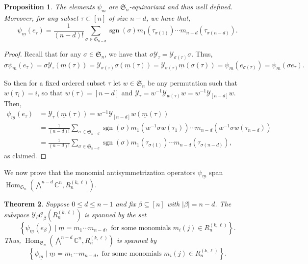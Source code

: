 \documentclass[11pt, reqno]{amsart}
\newtheorem{theorem}{Theorem}[section]
\newtheorem{proposition}[theorem]{Proposition}
\theoremstyle{definition}
\theoremstyle{remark}
\numberwithin{equation}{section}
\newcommand{\0}{\emptyset}
\newcommand{\C}{\mathbb{C}}
\renewcommand{\S}{\mathfrak{S}}
\newcommand{\cC}{\mathcal{C}}
\newcommand{\cY}{\mathcal{Y}}
\newcommand{\m}{\underline{m}}
\DeclareMathOperator{\sgn}{sgn}
\DeclareMathOperator{\Hom}{Hom}
\begin{document}
\begin{proposition}\label{prop:psi-m-well-defined}
    The elements $\psi_{\m}$ are $\S_n$-equivariant and thus well defined.
 Moreover, for any subset $\tau \subset [n]$ of size $n-d$, we have that, 
 \[ \psi_{\m}(e_\tau)  =  \frac{1}{(n-d)!} \sum_{\sigma \in \S_{n-d}} \sgn(\sigma ) m_1( \tau_{\sigma(1)}) \cdots m_{n-d}(\tau_{\sigma(n-d)}).\]
\end{proposition}
\begin{proof}
Recall that for any $\sigma \in \S_n$, we have that $\sigma \cY_\tau = \cY_{\sigma(\tau)} \sigma$. Thus, 
\[
\sigma \psi_{\m}(e_\tau) = \sigma \cY_\tau (\m(\tau)) = \cY_{\sigma(\tau)} \sigma(\m(\tau)) = \cY_{\sigma(\tau)} \m(\sigma(\tau)) = \psi_{\m}(e_{\sigma(\tau)}) =  \psi_{\m}(\sigma e_\tau).
\]    

So then for a fixed ordered subset $\tau$ let $w\in \S_n$ be any permutation such that $w(\tau_i)=i$, so that $w(\tau)=[n-d]$ and $\cY_\tau = w^{-1} \cY_{ w(\tau) } w =  w^{-1} \cY_{[ n-d] } w$. 
Then, 
\begin{align*}
    \psi_{\m}(e_\tau) 
    &= \cY_\tau(\m(\tau)) 
    = w^{-1} \cY_{[n-d]} w(\m(\tau))\\
    & = \frac{1}{(n-d)!} \sum_{\sigma \in \S_{n-d}} 
    \sgn(\sigma ) m_1(w^{-1}\sigma w( \tau_1)) \cdots m_{n-d}(w^{-1} \sigma w(\tau_{n-d})) \\
    &= \frac{1}{(n-d)!} \sum_{\sigma \in \S_{n-d}} 
    \sgn(\sigma ) m_1( \tau_{\sigma(1)}) \cdots m_{n-d}(\tau_{\sigma(n-d)}),
\end{align*}
as claimed.
\end{proof}

We now prove that the monomial antisymmetrization operators 
$\psi_{\m}$ span $\Hom_{\S_n}\left(\bigwedge^{n-d}\C^n, R_n^{(k, \ell)}\right)$. 

\begin{theorem}\label{thm:spanning} 
    Suppose $0\leq d \leq n-1$ and 
    fix $\beta \subseteq [n]$ with $|\beta|=n-d$. 
    The subspace 
    $\cY_{\beta} \cC_{\overline{\beta}}\left(R_n^{(k, \ell)}\right)$ 
    is spanned by the set 
    \[
        \left\{\psi_{\m}(e_\beta) \mid \m = m_1 \cdots m_{n-d},  
        \text{ for some monomials } 
        m_i(j) \in R_n^{(k, \ell)}\right\}.
    \]
    Thus, $\Hom_{\S_n}\left(\bigwedge^{n-d}\C^n, R_n^{(k, \ell)}\right)$ 
    is spanned by 
    \[
        \left\{\psi_{\m} \mid \m = m_1 \cdots m_{n-d}, 
        \text{ for some monomials } 
        m_i(j) \in R_n^{(k, \ell)}\right\}.
    \]
\end{theorem}
\end{document}
